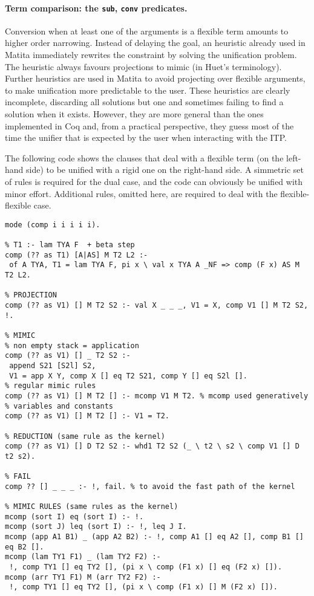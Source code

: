 \documentclass{easychair}
\begin{document}
\paragraph{Term comparison: the \texttt{sub}, \texttt{conv} predicates.}

Conversion when at least one of the arguments is a flexible term amounts to higher order narrowing. Instead of delaying the goal, an heuristic already used in Matita immediately rewrites the constraint by solving the unification problem. The heuristic always favours projections to mimic (in Huet's terminology). Further heuristics are used in Matita to avoid projecting over flexible arguments, to make unification more predictable to the user. These heuristics are clearly incomplete, discarding all solutions but one and sometimes failing to find a solution when it exists. However, they are more general than the ones implemented in Coq and, from a practical perspective, they guess most of the time the unifier that is expected by the user when interacting with the ITP.

The following code shows the clauses that deal with a flexible term (on the left-hand side) to be unified with a rigid one on the right-hand side. A simmetric set of rules is required for the dual case, and the code can obviously be unified with minor effort. Additional rules, omitted here, are required to deal with the flexible-flexible case.

\begin{Verbatim}
mode (comp i i i i i).

% T1 :- lam TYA F  + beta step
comp (?? as T1) [A|AS] M T2 L2 :-
 of A TYA, T1 = lam TYA F, pi x \ val x TYA A _NF => comp (F x) AS M T2 L2.

% PROJECTION
comp (?? as V1) [] M T2 S2 :- val X _ _ _, V1 = X, comp V1 [] M T2 S2, !.

% MIMIC
% non empty stack = application
comp (?? as V1) [] _ T2 S2 :-
 append S21 [S2l] S2,
 V1 = app X Y, comp X [] eq T2 S21, comp Y [] eq S2l [].
% regular mimic rules
comp (?? as V1) [] M T2 [] :- mcomp V1 M T2. % mcomp used generatively
% variables and constants
comp (?? as V1) [] M T2 [] :- V1 = T2.

% REDUCTION (same rule as the kernel)
comp (?? as V1) [] D T2 S2 :- whd1 T2 S2 (_ \ t2 \ s2 \ comp V1 [] D t2 s2).

% FAIL
comp ?? [] _ _ _ :- !, fail. % to avoid the fast path of the kernel

% MIMIC RULES (same rules as the kernel)
mcomp (sort I) eq (sort I) :- !.
mcomp (sort J) leq (sort I) :- !, leq J I.
mcomp (app A1 B1) _ (app A2 B2) :- !, comp A1 [] eq A2 [], comp B1 [] eq B2 [].
mcomp (lam TY1 F1) _ (lam TY2 F2) :-
 !, comp TY1 [] eq TY2 [], (pi x \ comp (F1 x) [] eq (F2 x) []).
mcomp (arr TY1 F1) M (arr TY2 F2) :-
 !, comp TY1 [] eq TY2 [], (pi x \ comp (F1 x) [] M (F2 x) []).
\end{Verbatim}
\end{document}
